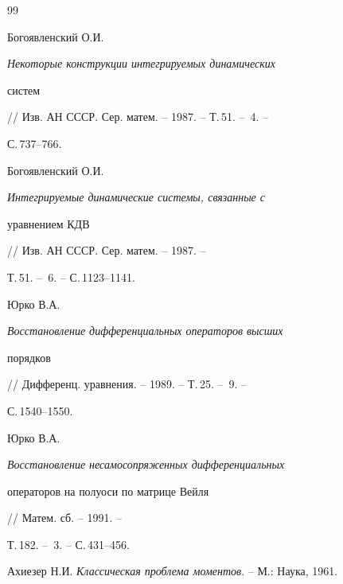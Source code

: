 \begin{thebibliography}{99}


Богоявленский О.И. {\em Некоторые конструкции интегрируемых динамических 


систем} // Изв. АН СССР. Сер. матем. -- 1987. -- Т.\,51. -- \No\,4. --


С.\,737--766. 




Богоявленский О.И. {\em Интегрируемые динамические системы, связанные с 


уравнением $К{\scriptstyle Д}В$} // Изв. АН СССР. Сер. матем. -- 1987. --


Т.\,51. -- \No\,6. -- С.\,1123--1141. 




Юрко В.А. {\em Восстановление дифференциальных операторов высших 


порядков} // Дифференц. уравнения. -- 1989. -- Т.\,25. -- \No\,9. -- 


С.\,1540--1550. 




Юрко В.А. {\em Восстановление несамосопряженных дифференциальных 


операторов на полуоси по матрице Вейля} // Матем. сб. -- 1991. -- 


Т.\,182. -- \No\,3. -- С.\,431--456. 




Ахиезер Н.И. {\em Классическая проблема моментов}. -- М.: Наука, 1961. 


 


\end{thebibliography} 


 


\vskip 0.5cm 


 






 


\label{end} 


 


